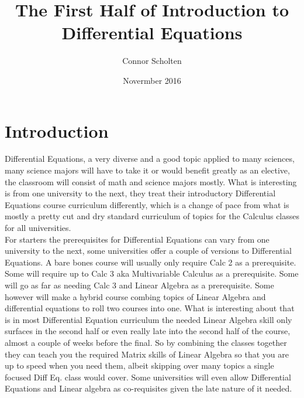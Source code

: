 \documentclass[12pt]{article}
\title{The First Half of Introduction to Differential Equations}
\author{Connor Scholten}
\date{Novermber 2016}
\begin{document}
\maketitle

\pagebreak

\tableofcontents

\pagebreak

\section{Introduction}

Differential Equations, a very diverse and a good topic applied to many sciences, many science majors will have to take it or would benefit greatly as an elective, the classroom will consist of math and science majors mostly. What is interesting is from one university to the next, they treat their introductory Differential Equations course curriculum differently, which is a change of pace from what is mostly a pretty cut and dry standard curriculum of topics for the Calculus classes for all universities. \\

For starters the prerequisites for Differential Equations can vary from one university to the next, some universities offer a couple of versions to Differential Equations. A bare bones course will usually only require Calc 2 as a prerequisite. Some will require up to Calc 3 aka Multivariable Calculus as a prerequisite. Some will go as far as needing Calc 3 and Linear Algebra as a prerequisite. Some however will make a hybrid course combing topics of Linear Algebra and differential equations to roll two courses into one. What is interesting about that is in most Differential Equation curriculum the needed Linear Algebra skill only surfaces in the second half or even really late into the second half of the course, almost a couple of weeks before the final. So by combining the classes together they can teach you the required Matrix skills of Linear Algebra so that you are up to speed when you need them, albeit skipping over many topics a single focused Diff Eq. class would cover. Some universities will even allow Differential Equations and Linear algebra as co-requisites given the late nature of it needed. \\
\end{document}
